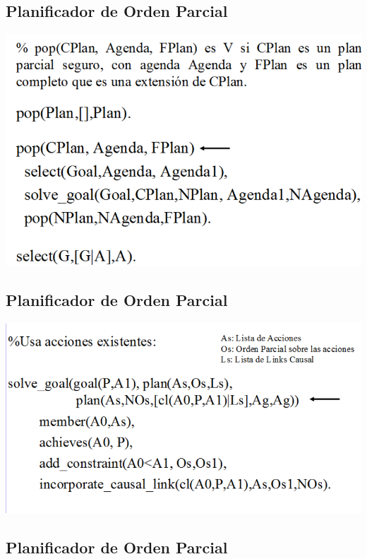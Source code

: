 \documentclass[11pt]{article}
\begin{document}
\subsection*{Planificador de Orden Parcial}
\label{sec:org53310ff}

\begin{center}
\includegraphics[width=.9\linewidth]{imagenes/Pop.png}
\end{center}

\subsection*{Planificador de Orden Parcial}
\label{sec:org8777bab}

\begin{center}
\includegraphics[width=.9\linewidth]{imagenes/Pop2.png}
\end{center}

\subsection*{Planificador de Orden Parcial}
\label{sec:org756563a}
\end{document}
